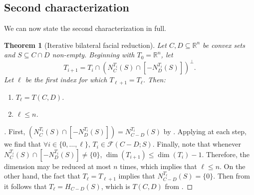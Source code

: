 \documentclass{article}
\theoremstyle{plain}
\newtheorem{theorem}{Theorem}[section]
\theoremstyle{definition}
\theoremstyle{remark}
\begin{document}
\subsection{Second characterization}
\label{loc:body.proofs.second_characterization}
We can now state the second characterization in full.
\begin{theorem}[Iterative bilateral facial reduction]
\label{loc:iterative_bilateral_facial_reduction.statement}
Let $C, D \subseteq \mathbb{R}^n$ be convex sets and 
$S \subseteq C \cap D$ non-empty. Beginning with $T_0  = \mathbb{R}^n$, let
\begin{equation*}
T_{i+1} = T_i \cap (N^{T_i}_{C}(S) \cap [-N^{T_i}_{D}(S)])^\perp.
\end{equation*}
Let $\ell$ be the first index for which 
$T_{\ell+1} = T_\ell$. Then:
\begin{enumerate}
\item $T_\ell =  T(C, D)$.
\item $\ell \leq n$.
\end{enumerate}
\end{theorem}
\begin{proof}[\hypertarget{loc:iterative_bilateral_facial_reduction.proof}Proof of \Cref{loc:iterative_bilateral_facial_reduction.statement}]

First, $(N^{T_i}_{C}(S) \cap [-N^{T_i}_{D}(S)]) = N^{T_i}_{C-D}(S)$ by .
Applying  at each step, we find that $\forall i  \in \{ 0, \ldots, \ell \},\, T_i \in \mathcal{F}(C-D;S)$.
Finally, note that whenever $N^{T_i}_{C}(S) \cap [-N^{T_i}_{D}(S)] \neq \{0\}$,
$\dim(T_{i+1})\le \dim(T_i) - 1$. Therefore, the dimension may be reduced
at most $n$ times, which implies that $\ell \le n$. On the other hand, the fact that $T_\ell = T_{\ell+1}$
implies that $N^{T_\ell}_{C-D}(S) = \{0\}$.
Then from
it follows that $T_\ell = H_{C-D}(S)$, which is $T(C,D)$ from .
\end{proof}
\end{document}
